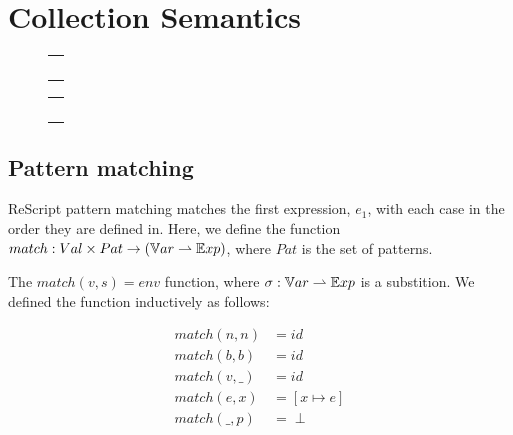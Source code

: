 \documentclass[../../master.tex]{subfiles}
\begin{document}
	
\section{Collection Semantics}\label{App:ColSem}
\begin{figure}[H]
	\setlength\tabcolsep{8pt}
	\begin{tabular}{l}
		\\[1cm]
		\\[1cm]
		\\[1cm]
		\\[1cm]
		\\[1cm]
		
	\end{tabular}
	\label{fig:InfDV}
\end{figure}

\begin{figure}[H]
	\setlength\tabcolsep{8pt}
	\begin{tabular}{l}
		\\[1cm]
		\\[1cm]
		\\[1cm]
		\\[1cm]
		\\[1cm]
		
	\end{tabular}
	\label{fig:InfDV}
\end{figure}

\subsection{Pattern matching}
ReScript pattern matching matches the first expression, $e_1$, with each case in the order they are defined in.
Here, we define the function $match:Val \times Pat \rightarrow (\mathbb{V}ar \rightharpoonup \mathbb{E}xp)$, where $Pat$ is the set of patterns.

The $match(v,s)=env$ function, where $\sigma:\mathbb{V}ar \rightharpoonup \mathbb{E}xp$ is a substition.
We defined the function inductively as follows:

\begin{align*}
	match(n,n) &= id\\
	match(b,b) &= id\\
	match(v,\_) &=id\\
	match(e,x) &= [x \mapsto e]\\
	match(\_,p) &= \perp
\end{align*}
\end{document}

